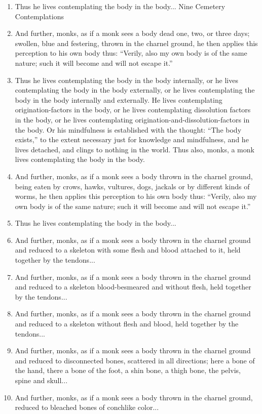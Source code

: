 \documentclass[a4 paper, 12pt]{article}
\begin{document}
\begin{multicols}{2}
\begin{enumerate}[resume]
\item Thus he lives contemplating the body in the body...
Nine Cemetery Contemplations
\item And further, monks, as if a monk sees a body dead one, two, or three days; swollen, blue and festering, thrown in the charnel ground, he then applies this perception to his own body thus: “Verily, also my own body is of the same nature; such it will become and will not escape it.”
\item Thus he lives contemplating the body in the body internally, or he lives contemplating the body in the body externally, or he lives contemplating the body in the body internally and externally. He lives contemplating origination-factors in the body, or he lives contemplating dissolution factors in the body, or he lives contemplating origination-and-dissolution-factors in the body. Or his mindfulness is established with the thought: “The body exists,” to the extent necessary just for knowledge and mindfulness, and he lives detached, and clings to nothing in the world. Thus also, monks, a monk lives contemplating the body in the body.
\item And further, monks, as if a monk sees a body thrown in the charnel ground, being eaten by crows, hawks, vultures, dogs, jackals or by different kinds of worms, he then applies this perception to his own body thus: “Verily, also my own body is of the same nature; such it will become and will not escape it.”
\item Thus he lives contemplating the body in the body...
\item And further, monks, as if a monk sees a body thrown in the charnel ground and reduced to a skeleton with some flesh and blood attached to it, held together by the tendons...
\item And further, monks, as if a monk sees a body thrown in the charnel ground and reduced to a skeleton blood-besmeared and without flesh, held together by the tendons...
\item And further, monks, as if a monk sees a body thrown in the charnel ground and reduced to a skeleton without flesh and blood, held together by the tendons...
\item And further, monks, as if a monk sees a body thrown in the charnel ground and reduced to disconnected bones, scattered in all directions; here a bone of the hand, there a bone of the foot, a shin bone, a thigh bone, the pelvis, spine and skull...
\item And further, monks, as if a monk sees a body thrown in the charnel ground, reduced to bleached bones of conchlike color...

\end{enumerate}
\end{multicols}
\end{document}
